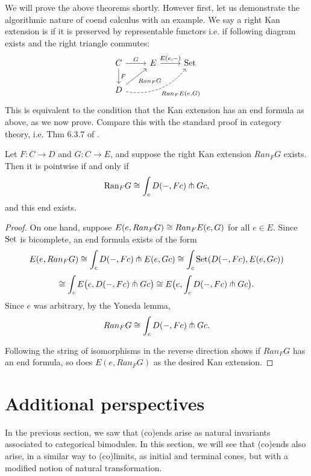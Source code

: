 We will prove the above theorems shortly. However first, let us demonstrate the algorithmic nature of coend calculus with an example. We say a right Kan extension is  if it is preserved by representable functors i.e. if following diagram exists and the right triangle commutes:
\[\begin{tikzcd}
C \arrow[d, "F"] \arrow[r, "G"]                                            & E \arrow[r, "{E(e,-)}"] & \Set \\
D \arrow[ru, "Ran_FG"'] \arrow[rru, "{Ran_F E(e,G)}"', dashed, bend right] &                         &    
\end{tikzcd}\]
This is equivalent to the condition that the Kan extension has an end formula as above, as we now prove. Compare this with the standard proof in category theory, i.e. Thm 6.3.7 of \cite{Riehl}.

\begin{proposition}
Let $F:C\rightarrow D$ and $G:C\rightarrow E$, and suppose the right Kan extension $Ran_FG$ exists. Then it is pointwise if and only if $$\text{Ran}_FG\cong \int_c D(-,Fc)\pitchfork Gc,$$ and this end exists.
\end{proposition}
\begin{proof}
    On one hand, suppose $E(e,Ran_FG)\cong Ran_FE(e,G)$ for all $e\in E.$ Since ${\text{Set}}$ is bicomplete, an end formula exists of the form 
    $$E(e,Ran_FG)\cong \int_{c} D(-,Fc)\pitchfork E(e,Gc)\cong \int_c {\text{Set}}(D(-,Fc),E(e,Gc))$$
    $$\cong \int_cE\big(e,D(-,Fc)\pitchfork Gc\big)\cong E\big(e,\int_cD(-,Fc)\pitchfork Gc\big).$$
    Since $e$ was arbitrary, by the Yoneda lemma, $$Ran_FG\cong \int_cD(-,Fc)\pitchfork Gc.$$

    Following the string of isomorphisms in the reverse direction shows if $Ran_FG$ has an end formula, so does $E(e,Ran_FG)$ as the desired Kan extension.
\end{proof}

\section{Additional perspectives}\label{sec:dinatural-transformations}
In the previous section, we saw that (co)ends arise as natural invariants associated to categorical bimodules. In this section, we will see that (co)ends also arise, in a similar way to (co)limits, as initial and terminal cones, but with a modified notion of natural transformation.

